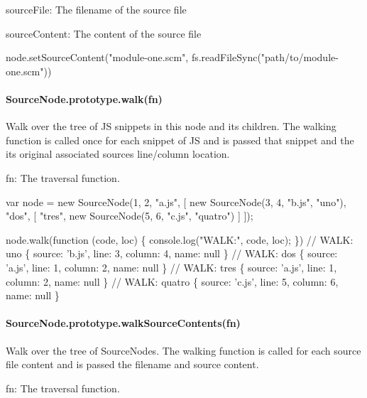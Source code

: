 \begin{DoxyItemize}
\item {\ttfamily source\+File}\+: The filename of the source file
\item {\ttfamily source\+Content}\+: The content of the source file
\end{DoxyItemize}


\begin{DoxyCode}
node.setSourceContent("module-one.scm",
                      fs.readFileSync("path/to/module-one.scm"))
\end{DoxyCode}


\paragraph*{Source\+Node.\+prototype.\+walk(fn)}

Walk over the tree of JS snippets in this node and its children. The walking function is called once for each snippet of JS and is passed that snippet and the its original associated source\textquotesingle{}s line/column location.


\begin{DoxyItemize}
\item {\ttfamily fn}\+: The traversal function.
\end{DoxyItemize}


\begin{DoxyCode}
var node = new SourceNode(1, 2, "a.js", [
  new SourceNode(3, 4, "b.js", "uno"),
  "dos",
  [
    "tres",
    new SourceNode(5, 6, "c.js", "quatro")
  ]
]);

node.walk(function (code, loc) \{ console.log("WALK:", code, loc); \})
// WALK: uno \{ source: 'b.js', line: 3, column: 4, name: null \}
// WALK: dos \{ source: 'a.js', line: 1, column: 2, name: null \}
// WALK: tres \{ source: 'a.js', line: 1, column: 2, name: null \}
// WALK: quatro \{ source: 'c.js', line: 5, column: 6, name: null \}
\end{DoxyCode}


\paragraph*{Source\+Node.\+prototype.\+walk\+Source\+Contents(fn)}

Walk over the tree of Source\+Nodes. The walking function is called for each source file content and is passed the filename and source content.


\begin{DoxyItemize}
\item {\ttfamily fn}\+: The traversal function.
\end{DoxyItemize}


